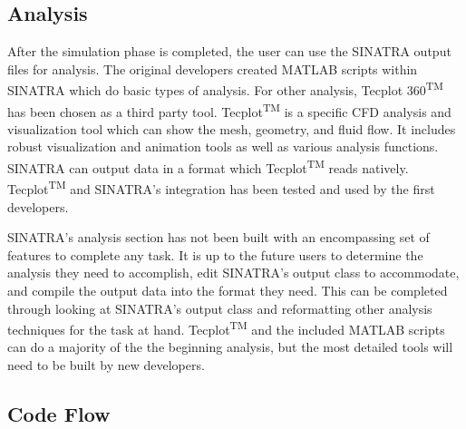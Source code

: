 
\subsection{Analysis}


 After the simulation phase is completed, the user can use the SINATRA output files for analysis. The original developers created MATLAB scripts within SINATRA which do basic types of analysis. For other analysis, Tecplot 360\textsuperscript{TM} \cite{tecplot} has been chosen as a third party tool. Tecplot\textsuperscript{TM} is a specific CFD analysis and visualization tool which can show the mesh, geometry, and fluid flow. It includes robust visualization and animation tools as well as various analysis functions. SINATRA can output data in a format which Tecplot\textsuperscript{TM} reads natively. Tecplot\textsuperscript{TM} and SINATRA's integration has been tested and used by the first developers.\par
 \indent SINATRA's analysis section has not been built with an encompassing set of features to complete any task. It is up to the future users to determine the analysis they need to accomplish, edit SINATRA's output class to accommodate, and compile the output data into the format they need. This can be completed through looking at SINATRA's output class and reformatting other analysis techniques for the task at hand. Tecplot\textsuperscript{TM} and the included MATLAB scripts can do a majority of the the beginning analysis, but the most detailed tools will need to be built by new developers. 


\subsection{Code Flow} %
 
 
